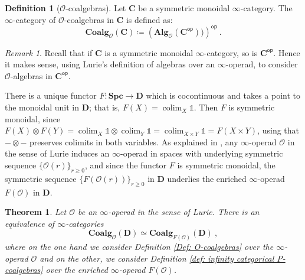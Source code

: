 \documentclass{proc-l}
\DeclareMathOperator*{\colim}{colim}
\theoremstyle{plain}
\newtheorem{theorem}{Theorem}[section]
\theoremstyle{definition}
\newtheorem{definition}[{theorem}]{Definition}
\theoremstyle{remark}
\newtheorem{remark}[{theorem}]{Remark}
\begin{document}
\begin{definition}[{$\mathscr{O}$-coalgebras}]%
\label{Definition:3.18}\label{Def: O-coalgebras}
Let $\mathbf{C}$ be a symmetric monoidal $\infty$-category. The $\infty$-category of $\mathscr{O}$-coalgebras in $\mathbf{C}$ is defined as:
\[
\mathbf{Coalg}_{\mathscr{O}}(\mathbf{C}) \coloneqq \left(\mathbf{Alg}_{\mathscr{O}}(\mathbf{C}^{\mathsf{op}}))\right)^{\mathsf{op}}~.
\]
\end{definition}

\begin{remark}%
\label{Remark:3.19}Recall that if $\mathbf{C}$ is a symmetric monoidal $\infty$-category, so is $\mathbf{C}^{\mathsf{op}}$. Hence it makes sense, using Lurie's definition of algebras over an $\infty$-operad, to consider $\mathscr{O}$-algebras in $\mathbf{C}^{\mathsf{op}}$.
\end{remark}

There is a unique functor $F : \mathbf{Spc}\longrightarrow \mathbf D$ which is cocontinuous and takes a point to the monoidal unit in $\mathbf D$; that is, $F(X)=\colim_X \mathbb 1$. Then $F$ is symmetric monoidal, since $F(X) \otimes F(Y) = \colim_X \mathbb 1 \otimes \colim_Y \mathbb 1 = \colim_{X \times Y} \mathbb 1 = F(X\times Y)$, using that $-\otimes-$ preserves colimits in both variables.
As explained in \cite[Appendix A.2]{ShiPhD}, any $\infty$-operad $\mathscr{O}$ in the sense of Lurie induces an $\infty$-operad  in spaces with underlying symmetric sequence $\{\mathscr{O}(r)\}_{r \geq 0}$, and since the functor $F$ is symmetric monoidal, the symmetric sequence $\{F(\mathscr{O}(r))\}_{r \geq 0}$ in $\mathbf{D}$ underlies the enriched $\infty$-operad $F(\mathscr{O})$ in $\mathbf{D}$.

\begin{theorem}%
\label{Theorem:3.20}\label{thm: comparison with coalgebras in the sense of Lurie}
Let $\mathscr{O}$ be an $\infty$-operad in the sense of Lurie. There is an equivalence of $\infty$-categories
\[
\mathbf{Coalg}_{\mathscr{O}}(\mathbf{D}) \simeq \mathbf{Coalg}_{F(\mathscr{O})}(\mathbf{D})~,
\]
where on the one hand we consider Definition \ref{Def: O-coalgebras} over the $\infty$-operad $\mathscr{O}$ and on the other, we consider Definition \ref{def: infinity categorical P-coalgebras} over the enriched $\infty$-operad $F(\mathscr{O})$.
\end{theorem}
\end{document}
